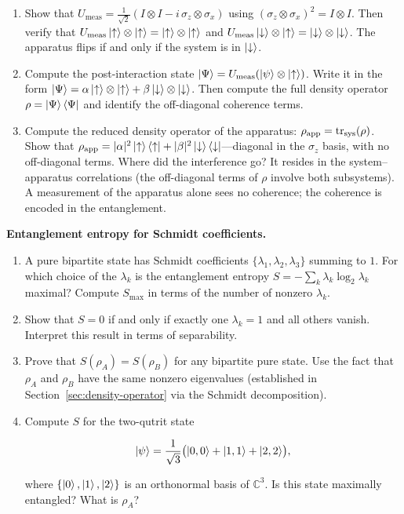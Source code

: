 \begin{problemset}
\begin{enumerate}
\item[(a)] Show that $U_{\text{meas}} = \frac{1}{\sqrt{2}}(I \otimes I - i\,\sigma_z \otimes \sigma_x)$ using $(\sigma_z \otimes \sigma_x)^2 = I \otimes I$. Then verify that $U_{\text{meas}}\ket{\uparrow} \otimes \ket{\uparrow} = \ket{\uparrow} \otimes \ket{\uparrow}$ and $U_{\text{meas}}\ket{\downarrow} \otimes \ket{\uparrow} = \ket{\downarrow} \otimes \ket{\downarrow}$. The apparatus flips if and only if the system is in $\ket{\downarrow}$.
\item[(b)] Compute the post-interaction state $\ket{\Psi} = U_{\text{meas}}(\ket{\psi} \otimes \ket{\uparrow})$. Write it in the form $\ket{\Psi} = \alpha\ket{\uparrow}\otimes\ket{\uparrow} + \beta\ket{\downarrow}\otimes\ket{\downarrow}$. Then compute the full density operator $\rho = \ket{\Psi}\bra{\Psi}$ and identify the off-diagonal coherence terms.
\item[(c)] Compute the reduced density operator of the apparatus: $\rho_{\text{app}} = \mathrm{tr}_{\text{sys}}(\rho)$. Show that $\rho_{\text{app}} = \lvert\alpha\rvert^2\ket{\uparrow}\bra{\uparrow} + \lvert\beta\rvert^2\ket{\downarrow}\bra{\downarrow}$---diagonal in the $\sigma_z$ basis, with no off-diagonal terms. Where did the interference go? It resides in the system--apparatus correlations (the off-diagonal terms of $\rho$ involve both subsystems). A measurement of the apparatus alone sees no coherence; the coherence is encoded in the entanglement.
\end{enumerate}

\item[Exercise 7.10] \textbf{Entanglement entropy for Schmidt coefficients.}
\label{item:ex-entropy}

\begin{enumerate}
\item[(a)] A pure bipartite state has Schmidt coefficients $\{\lambda_1, \lambda_2, \lambda_3\}$ summing to $1$. For which choice of the $\lambda_k$ is the entanglement entropy $S = -\sum_k \lambda_k \log_2 \lambda_k$ maximal? Compute $S_{\max}$ in terms of the number of nonzero $\lambda_k$.
\item[(b)] Show that $S = 0$ if and only if exactly one $\lambda_k = 1$ and all others vanish. Interpret this result in terms of separability.
\item[(c)] Prove that $S(\rho_A) = S(\rho_B)$ for any bipartite pure state. Use the fact that $\rho_A$ and $\rho_B$ have the same nonzero eigenvalues (established in Section~\ref{sec:density-operator} via the Schmidt decomposition).
\item[(d)] Compute $S$ for the two-qutrit state
\begin{linenomath}
\begin{equation}
\ket{\psi} = \frac{1}{\sqrt{3}}\bigl(\ket{0,0} + \ket{1,1} + \ket{2,2}\bigr),
\end{equation}
\end{linenomath}
where $\{\ket{0}, \ket{1}, \ket{2}\}$ is an orthonormal basis of $\mathbb{C}^3$. Is this state maximally entangled? What is $\rho_A$?
\end{enumerate}

\end{problemset}
